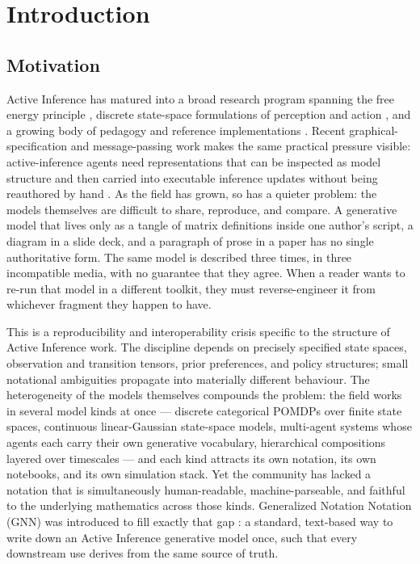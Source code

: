 \documentclass[
  english,
  9pt,
]{extarticle}
\begin{document}
\newpage

\section{Introduction}\label{sec:introduction}

\subsection{Motivation}\label{motivation}

Active Inference has matured into a broad research program spanning the
free energy principle \citep{friston2010}, discrete state-space
formulations of perception and action \citep{dacosta2020}, and a growing
body of pedagogy and reference implementations
\citep{parr2022, smith2022}. Recent graphical-specification and
message-passing work makes the same practical pressure visible:
active-inference agents need representations that can be inspected as
model structure and then carried into executable inference updates
without being reauthored by hand
\citep{koudahl2023syntheticAgents1, vandelaaar2023syntheticAgents2, bagaev2021reactiveMessagePassing}.
As the field has grown, so has a quieter problem: the models themselves
are difficult to share, reproduce, and compare. A generative model that
lives only as a tangle of matrix definitions inside one author's script,
a diagram in a slide deck, and a paragraph of prose in a paper has no
single authoritative form. The same model is described three times, in
three incompatible media, with no guarantee that they agree. When a
reader wants to re-run that model in a different toolkit, they must
reverse-engineer it from whichever fragment they happen to have.

This is a reproducibility and interoperability crisis specific to the
structure of Active Inference work. The discipline depends on precisely
specified state spaces, observation and transition tensors, prior
preferences, and policy structures; small notational ambiguities
propagate into materially different behaviour. The heterogeneity of the
models themselves compounds the problem: the field works in several
model kinds at once --- discrete categorical POMDPs over finite state
spaces, continuous linear-Gaussian state-space models, multi-agent
systems whose agents each carry their own generative vocabulary,
hierarchical compositions layered over timescales --- and each kind
attracts its own notation, its own notebooks, and its own simulation
stack. Yet the community has lacked a notation that is simultaneously
human-readable, machine-parseable, and faithful to the underlying
mathematics across those kinds. Generalized Notation Notation (GNN) was
introduced to fill exactly that gap \citep{gnn2023}: a standard,
text-based way to write down an Active Inference generative model once,
such that every downstream use derives from the same source of truth.
\end{document}
